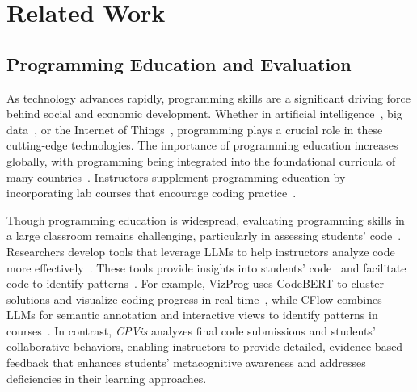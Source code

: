 \section{Related Work}
\label{sec:related}

\subsection{Programming Education and Evaluation}
As technology advances rapidly, programming skills are a significant driving force behind social and economic development. 
Whether in artificial intelligence~\cite{breideband2023community}, big data~\cite{rasul2023role}, or the Internet of Things~\cite{deline2021glinda}, programming plays a crucial role in these cutting-edge technologies.
The importance of programming education increases globally, with programming being integrated into the foundational curricula of many countries~\cite{yan2019pensieve}. 
Instructors supplement programming education by incorporating lab courses that encourage coding practice~\cite{park2018elicast}. 

Though programming education is widespread, evaluating programming skills in a large classroom remains challenging, particularly in assessing students' code~\cite{zhang2024cflow}. 
Researchers develop tools that leverage LLMs to help instructors analyze code more effectively~\cite{hellas2023exploring,leinonen2023comparing}. 
These tools provide insights into students' code~\cite{glassman2015overcode,guo2015codeopticon} and facilitate code to identify patterns~\cite{mathew2020slacc,mathew2021cross,zhang2023runex}. 
For example, VizProg uses CodeBERT to cluster solutions and visualize coding progress in real-time~\cite{zhang2023vizprog}, while CFlow combines LLMs for semantic annotation and interactive views to identify patterns in courses~\cite{zhang2024cflow}. 
In contrast, \textit{CPVis} analyzes final code submissions and students' collaborative behaviors, enabling instructors to provide detailed, evidence-based feedback that enhances students' metacognitive awareness and addresses deficiencies in their learning approaches.

